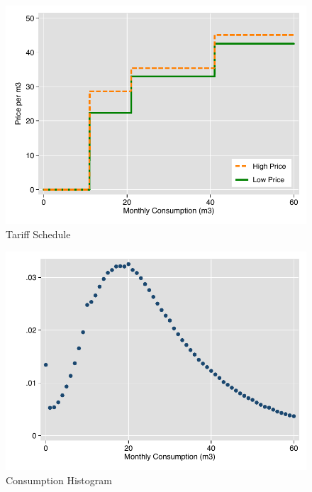 \documentclass[12pt,table]{article}
\begin{document}
\begin{figure}
\caption{Tariff Schedule}
\begin{center}
\includegraphics[scale=1]{tables/rs_prices.pdf}
\end{center}
\end{figure}

\begin{figure}
\begin{center}
\caption{Consumption Histogram}
\includegraphics[scale=1]{tables/consumption_histogram.pdf}
\end{center}
\end{figure}


{
\small
\nocite{*}


}
\end{document}
